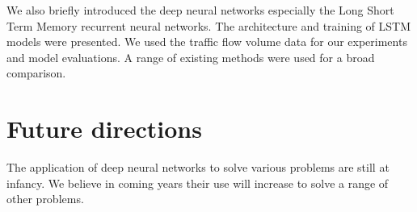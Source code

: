 We also briefly introduced the deep neural networks especially the Long Short Term Memory recurrent
neural networks. The architecture and training of LSTM models were presented. We used the traffic
flow volume data for our experiments and model evaluations. A range of existing methods were used
for a broad comparison.

\section{Future directions}
The application of deep neural networks to solve various problems are still at infancy. We believe in
coming years their use will increase to solve a range of other problems.